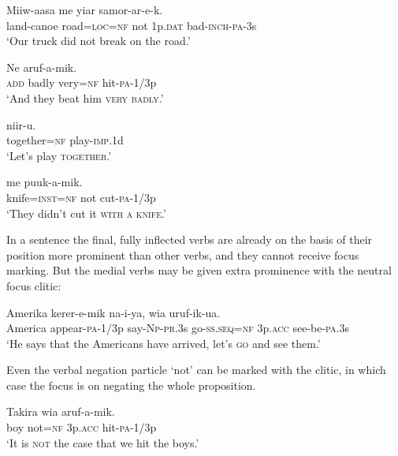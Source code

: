 \ea%
\label{ex:x1724}
\gll Miiw-aasa    me  yiar  samor-ar-e-k. \\
land-canoe  road=\textsc{loc}=\textsc{nf}  not  1p.\textsc{dat}  bad-\textsc{inch}-\textsc{pa}-3s      \\
\glt`Our truck did not break on the road.'
\z


\ea%
\label{ex:x1730}
\gll Ne    aruf-a-mik.\\
\textsc{add}  badly  very=\textsc{nf}  hit-\textsc{pa}-1/3p\\
\glt`And they beat him \textsc{very badly}.'
\z


\ea%
\label{ex:x1725}
\gll {}  niir-u. \\
together=\textsc{nf}  play-\textsc{imp}.1d      \\
\glt`Let's play \textsc{together}.'
\z


\ea%
\label{ex:x1726}
\gll {}  me  puuk-a-mik. \\
knife=\textsc{inst}=\textsc{nf}  not  cut-\textsc{pa}-1/3p      \\
\glt`They didn't cut it \textsc{with a knife}.'
\z


In a sentence the final, fully inflected verbs are already on the basis of their position more prominent than other verbs, and they cannot receive focus marking. But the medial verbs may be given extra prominence with the neutral focus clitic:

\ea%
\label{ex:x1727}
\gll Amerika  kerer-e-mik  na-i-ya,   wia  uruf-ik-ua.\\
America  appear-\textsc{pa}-1/3p  say-\textsc{Np}-\textsc{pr}.3s  go-\textsc{ss}.\textsc{seq}=\textsc{nf} 3p.\textsc{acc}  see-be-\textsc{pa}.3s     \\
\glt`He says that the Americans have arrived, let's \textsc{go} and see them.'
\z


Even the verbal negation particle  `not' can be marked with the  clitic, in which case the focus is on negating the whole proposition.

\ea%
\label{ex:x1728}
\gll Takira    wia  aruf-a-mik. \\
boy  not=\textsc{nf}  3p.\textsc{acc}  hit-\textsc{pa}-1/3p      \\
\glt`It is \textsc{not} the case that we hit the boys.'
\z


